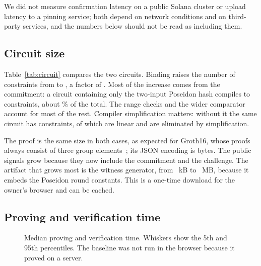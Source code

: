 We did not measure confirmation latency on a public Solana cluster or upload
latency to a pinning service; both depend on network conditions and on
third-party services, and the numbers below should not be read as including
them.

\subsection{Circuit size}

\begin{table}[t]
\centering
\caption{Size of the constraint system and of the artifacts.}
\label{tab:circuit}
\tablefont

\end{table}

Table~\ref{tab:circuit} compares the two circuits. Binding raises the number
of constraints from \OldConstraints{} to \NewConstraints, a factor of
\ConstraintGrowth. Most of the increase comes from the commitment: a
circuit containing only the two-input Poseidon hash compiles to
\PoseidonConstraints{} constraints, about \PoseidonPercent\% of the total.
The range checks and the wider comparator account for most of the rest.
Compiler
simplification matters: without it the same circuit has
\UnsimplifiedConstraints{} constraints, of which \UnsimplifiedLinear{} are
linear and are eliminated by simplification.

The proof is the same size in both cases, as expected for Groth16, whose
proofs always consist of three group elements~\cite{groth2016}; its JSON
encoding is \NewProofBytes{} bytes. The public signals grow because they now
include the commitment and the challenge. The artifact that grows most is
the witness generator, from \OldWasmKb~kB to \NewWasmMb~MB, because it embeds
the Poseidon round constants. This is a one-time download for the owner's
browser and can be cached.

\subsection{Proving and verification time}

\begin{table}[t]
\centering
\caption{Time in milliseconds: median (5th--95th percentile).}
\label{tab:timing}
\tablefont

\end{table}

\begin{figure}[t]
\centering

\caption{Median proving and verification time. Whiskers show the 5th and
95th percentiles. The baseline was not run in the browser because it proved
on a server.}
\label{fig:timing}
\end{figure}

